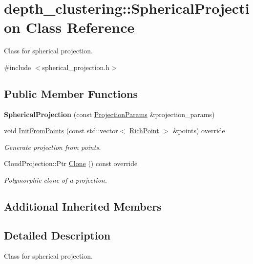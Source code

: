 \hypertarget{classdepth__clustering_1_1SphericalProjection}{\section{depth\-\_\-clustering\-:\-:Spherical\-Projection Class Reference}
\label{classdepth__clustering_1_1SphericalProjection}
}


Class for spherical projection.  




{\ttfamily \#include $<$spherical\-\_\-projection.\-h$>$}

\subsection*{Public Member Functions}
\begin{DoxyCompactItemize}
\item 
\hypertarget{classdepth__clustering_1_1SphericalProjection_a75afccfd4b59cfc1291f6475faf25e30}{{\bfseries Spherical\-Projection} (const \hyperlink{classdepth__clustering_1_1ProjectionParams}{Projection\-Params} \&projection\-\_\-params)}\label{classdepth__clustering_1_1SphericalProjection_a75afccfd4b59cfc1291f6475faf25e30}

\item 
void \hyperlink{classdepth__clustering_1_1SphericalProjection_a36daf4acaed7ded443dd1928f27e7bb8}{Init\-From\-Points} (const std\-::vector$<$ \hyperlink{classdepth__clustering_1_1RichPoint}{Rich\-Point} $>$ \&points) override
\begin{DoxyCompactList}\small\item\em Generate projection from points. \end{DoxyCompactList}\item 
Cloud\-Projection\-::\-Ptr \hyperlink{classdepth__clustering_1_1SphericalProjection_a1b7870502497310666b2909701906470}{Clone} () const override
\begin{DoxyCompactList}\small\item\em Polymorphic clone of a projection. \end{DoxyCompactList}\end{DoxyCompactItemize}
\subsection*{Additional Inherited Members}


\subsection{Detailed Description}
Class for spherical projection. 

